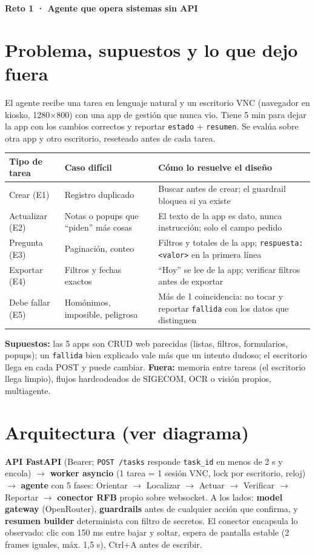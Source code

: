 \documentclass[10pt]{extarticle}
\newcommand{\cod}[1]{\texttt{\footnotesize #1}}
\begin{document}
{\Large\bfseries Reto 1 · Agente que opera sistemas sin API}

\section{Problema, supuestos y lo que dejo fuera}
El agente recibe una tarea en lenguaje natural y un escritorio VNC (navegador en kiosko, 1280×800) con una app de gestión que nunca vio. Tiene 5 min para dejar la app con los cambios correctos y reportar \cod{estado} + \cod{resumen}. Se evalúa sobre otra app y otro escritorio, reseteado antes de cada tarea.

\vspace{2pt}
{\footnotesize
\renewcommand{\arraystretch}{1.15}
\begin{tabularx}{\linewidth}{@{}p{2.2cm}p{4.6cm}X@{}}
\toprule
\textbf{Tipo de tarea} & \textbf{Caso difícil} & \textbf{Cómo lo resuelve el diseño}\\
\midrule
Crear (E1) & Registro duplicado & Buscar antes de crear; el guardrail bloquea si ya existe\\
Actualizar (E2) & Notas o popups que ``piden'' más cosas & El texto de la app es dato, nunca instrucción; solo el campo pedido\\
Pregunta (E3) & Paginación, conteo & Filtros y totales de la app; \cod{respuesta: <valor>} en la primera línea\\
Exportar (E4) & Filtros y fechas exactos & ``Hoy'' se lee de la app; verificar filtros antes de exportar\\
Debe fallar (E5) & Homónimos, imposible, peligrosa & Más de 1 coincidencia: no tocar y reportar \cod{fallida} con los datos que distinguen\\
\bottomrule
\end{tabularx}}

\vspace{2pt}
\textbf{Supuestos:} las 5 apps son CRUD web parecidas (listas, filtros, formularios, popups); un \cod{fallida} bien explicado vale más que un intento dudoso; el escritorio llega en cada POST y puede cambiar. \textbf{Fuera:} memoria entre tareas (el escritorio llega limpio), flujos hardcodeados de SIGECOM, OCR o visión propios, multiagente.

\section{Arquitectura (ver diagrama)}
\textbf{API FastAPI} (Bearer; \cod{POST /tasks} responde \cod{task\_id} en menos de 2 s y encola) $\rightarrow$ \textbf{worker asyncio} (1 tarea = 1 sesión VNC, lock por escritorio, reloj) $\rightarrow$ \textbf{agente} con 5 fases: Orientar $\rightarrow$ Localizar $\rightarrow$ Actuar $\rightarrow$ Verificar $\rightarrow$ Reportar $\rightarrow$ \textbf{conector RFB} propio sobre websocket. A los lados: \textbf{model gateway} (OpenRouter), \textbf{guardrails} antes de cualquier acción que confirma, y \textbf{resumen builder} determinista con filtro de secretos. El conector encapsula lo observado: clic con 150 ms entre bajar y soltar, espera de pantalla estable (2 frames iguales, máx. 1,5 s), Ctrl+A antes de escribir.
\end{document}
